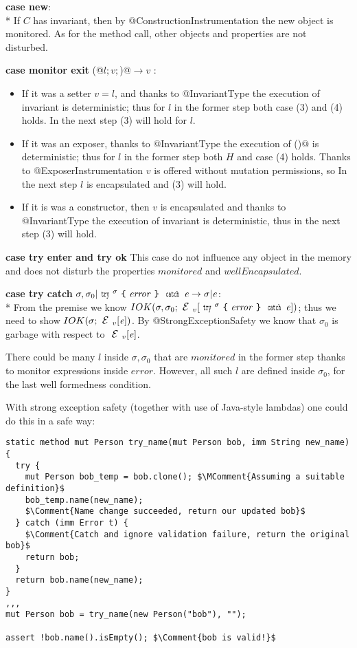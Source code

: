 \noindent\textbf{case new}:\\*
  If $C$ has invariant, then by @ConstructionInstrumentation the new object is monitored.
As for the method call, other objects and properties are not disturbed.


\noindent\textbf{case monitor exit} \Q@M(@$l;v;$\Q@true)@$\rightarrow v$ :
  \begin{itemize}
\item
    If it was a setter $v=l$, and 
    thanks to @InvariantType the execution of invariant is deterministic;
    thus for $l$ in the former step both case (3) and (4) holds.
    In the next step (3) will hold for $l$.
\item
    If it was an exposer, thanks to @InvariantType the execution of \Q@invariant()@ is deterministic;
    thus for $l$ in the former step both $H$ and case (4) holds.
    Thanks to @ExposerInstrumentation $v$ is offered without mutation permissions, so
    In the next step $l$ is encapsulated and (3) will hold.
\item
    If it is was a constructor, 
    then $v$ is encapsulated and thanks to @InvariantType
    the execution of invariant is deterministic, thus in the next step (3) will hold.
\end{itemize}

\noindent\textbf{case try enter and try ok}
This case do not influence any object in the memory and does not
disturb the properties $\mathit{monitored}$ and $\mathit{wellEncapsulated}$.

\noindent\textbf{case try catch} $\sigma,\sigma_0|\Kw{try}^\sigma \oC\mathit{error}\cC\Kw{catch}\, \e\rightarrow \sigma|\e$:\\*
From the premise we know 
$IOK(\sigma,\sigma_0;\ctx_v[\Kw{try}^\sigma \oC\mathit{error}\cC\Kw{catch}\, \e])$;
thus we need to show
$IOK(\sigma;\ctx_v[\e])$.
By @StrongExceptionSafety we know that $\sigma_0$ is garbage with respect to $\ctx_v[\e]$.

There could be many $l$ inside $\sigma,\sigma_0$ that are $\mathit{monitored}$
in the former step thanks to monitor expressions inside $\mathit{error}$.
However, all such $l$ are defined inside $\sigma_0$,
for the last well formedness condition.

With strong exception safety (together with use of Java-style lambdas) one could do this in a safe way:
\saveSpace
\begin{lstlisting}
static method mut Person try_name(mut Person bob, imm String new_name) {
  try {
    mut Person bob_temp = bob.clone(); $\MComment{Assuming a suitable definition}$
    bob_temp.name(new_name);
    $\Comment{Name change succeeded, return our updated bob}$
  } catch (imm Error t) {
    $\Comment{Catch and ignore validation failure, return the original bob}$
    return bob;
  }
  return bob.name(new_name);
}
,,,
mut Person bob = try_name(new Person("bob"), "");

assert !bob.name().isEmpty(); $\Comment{bob is valid!}$

\end{lstlisting}
\saveSpace
